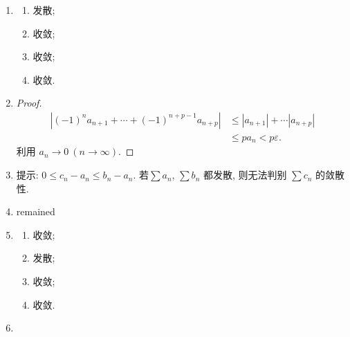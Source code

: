 % 
\begin{enumerate}
    \item %
        \begin{multicols}{4}
            \begin{enumerate}[(1)]
                \item %
                    发散;
                \item %
                    收敛;
                \item %
                    收敛;
                \item %
                    收敛.
            \end{enumerate}
        \end{multicols}
    \item %
        \begin{proof}
            \begin{align*}
                |(-1)^{n}a_{n+1} + \cdots + (-1)^{n+p-1}a_{n+p}| &\leq |a_{n+1}| + \cdots |a_{n+p}| \\
                &\leq pa_n < p\varepsilon.  
            \end{align*}
            利用 $a_n \to 0\ (n \to \infty)$.
        \end{proof}
    \item %
        提示: $0 \leq c_n - a_n \leq b_n - a_n$. 若$\sum a_n$, $\sum b_n$ 都发散, 则无法判别 $\sum c_n$ 的敛散性.
    \item %
        {\color{red}remained}
    \item %
        \begin{multicols}{4}
            \begin{enumerate}[(1)]
                \item %
                    收敛;
                \item %
                    发散;
                \item %
                    收敛;
                \item %
                    收敛.
            \end{enumerate}
        \end{multicols}
    \item %

\end{enumerate}
